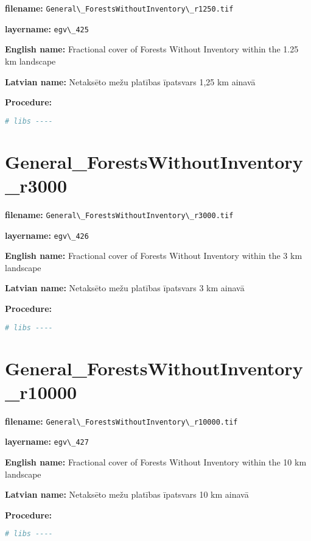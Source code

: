 \documentclass[
]{book}
\newcommand{\passthrough}[1]{#1}
\begin{document}
\textbf{filename:} \passthrough{\lstinline!General\_ForestsWithoutInventory\_r1250.tif!}

\textbf{layername:} \passthrough{\lstinline!egv\_425!}

\textbf{English name:} Fractional cover of Forests Without Inventory within the 1.25 km landscape

\textbf{Latvian name:} Netaksēto mežu platības īpatsvars 1,25 km ainavā

\textbf{Procedure:}

\begin{lstlisting}[language=R]
# libs ----
\end{lstlisting}

\section{General\_ForestsWithoutInventory\_r3000}\label{ch06.426}

\textbf{filename:} \passthrough{\lstinline!General\_ForestsWithoutInventory\_r3000.tif!}

\textbf{layername:} \passthrough{\lstinline!egv\_426!}

\textbf{English name:} Fractional cover of Forests Without Inventory within the 3 km landscape

\textbf{Latvian name:} Netaksēto mežu platības īpatsvars 3 km ainavā

\textbf{Procedure:}

\begin{lstlisting}[language=R]
# libs ----
\end{lstlisting}

\section{General\_ForestsWithoutInventory\_r10000}\label{ch06.427}

\textbf{filename:} \passthrough{\lstinline!General\_ForestsWithoutInventory\_r10000.tif!}

\textbf{layername:} \passthrough{\lstinline!egv\_427!}

\textbf{English name:} Fractional cover of Forests Without Inventory within the 10 km landscape

\textbf{Latvian name:} Netaksēto mežu platības īpatsvars 10 km ainavā

\textbf{Procedure:}

\begin{lstlisting}[language=R]
# libs ----
\end{lstlisting}
\end{document}
